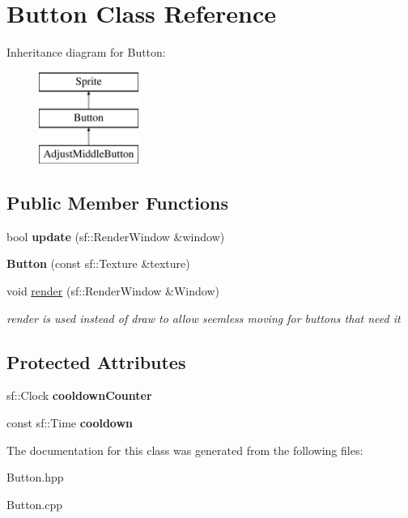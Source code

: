 \hypertarget{class_button}{\section{Button Class Reference}
\label{class_button}
}
Inheritance diagram for Button\-:\begin{figure}[H]
\begin{center}
\leavevmode
\includegraphics[height=3.000000cm]{class_button}
\end{center}
\end{figure}
\subsection*{Public Member Functions}
\begin{DoxyCompactItemize}
\item 
\hypertarget{class_button_a0ac5ee796c96cada2f46ec53d90b9d64}{bool {\bfseries update} (sf\-::\-Render\-Window \&window)}\label{class_button_a0ac5ee796c96cada2f46ec53d90b9d64}

\item 
\hypertarget{class_button_a740a5437a98746507da2d6d854777f90}{{\bfseries Button} (const sf\-::\-Texture \&texture)}\label{class_button_a740a5437a98746507da2d6d854777f90}

\item 
\hypertarget{class_button_a16e7549156216234a6111b24d6d2bd62}{void \hyperlink{class_button_a16e7549156216234a6111b24d6d2bd62}{render} (sf\-::\-Render\-Window \&Window)}\label{class_button_a16e7549156216234a6111b24d6d2bd62}

\begin{DoxyCompactList}\small\item\em render is used instead of draw to allow seemless moving for buttons that need it \end{DoxyCompactList}\end{DoxyCompactItemize}
\subsection*{Protected Attributes}
\begin{DoxyCompactItemize}
\item 
\hypertarget{class_button_a301a025a5f248413230198380cff086f}{sf\-::\-Clock {\bfseries cooldown\-Counter}}\label{class_button_a301a025a5f248413230198380cff086f}

\item 
\hypertarget{class_button_a00ae9520611d006294a7f53c4796a95e}{const sf\-::\-Time {\bfseries cooldown}}\label{class_button_a00ae9520611d006294a7f53c4796a95e}

\end{DoxyCompactItemize}


The documentation for this class was generated from the following files\-:\begin{DoxyCompactItemize}
\item 
Button.\-hpp\item 
Button.\-cpp\end{DoxyCompactItemize}
